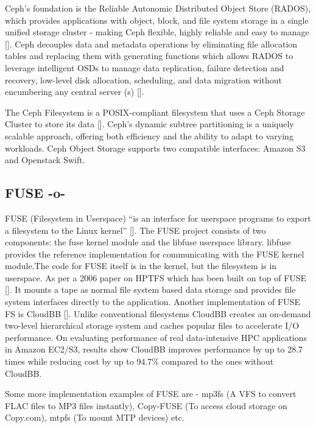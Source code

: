 Ceph's foundation is the Reliable Autonomic Distributed Object Store
(RADOS), which provides applications with object, block, and file
system storage in a single unified storage cluster - making Ceph
flexible, highly reliable and easy to manage [\cite{www-cepharch}]. Ceph
decouples data and metadata operations by eliminating file allocation
tables and replacing them with generating functions which allows RADOS
to leverage intelligent OSDs to manage data replication, failure
detection and recovery, low-level disk allocation, scheduling, and
data migration without encumbering any central server
(s) [\cite{paper-Ceph}].
 
The Ceph Filesystem is a POSIX-compliant filesystem that uses a Ceph
Storage Cluster to store its data [\cite{www-cephfs}]. Ceph's dynamic
subtree partitioning is a uniquely scalable approach, offering both
efficiency and the ability to adapt to varying workloads. Ceph Object
Storage supports two compatible interfaces: Amazon S3 and Openstack
Swift.



\subsection{FUSE -o-}

FUSE (Filesystem in Userspace) ``is an interface for userspace
programs to export a filesystem to the Linux
kernel'' [\cite{www-fuse}]. The FUSE project consists of two components:
the fuse kernel module and the libfuse userspace library. libfuse
provides the reference implementation for communicating with the FUSE
kernel module.The code for FUSE itself is in the kernel, but the
filesystem is in userspace.  As per a 2006 paper on HPTFS which has
been built on top of FUSE [\cite{fuse-paper-hptfs}]. It mounts a tape as
normal file system based data storage and provides file system
interfaces directly to the application.  Another implementation of
FUSE FS is CloudBB [\cite{fuse-paper-CloudBB}]. Unlike conventional
filesystems CloudBB creates an on-demand two-level hierarchical
storage system and caches popular files to accelerate I/O
performance. On evaluating performance of real data-intensive HPC
applications in Amazon EC2/S3, results show CloudBB improves
performance by up to 28.7 times while reducing cost by up to 94.7\%
compared to the ones without CloudBB.

Some more implementation examples of FUSE are - mp3fs (A VFS to
convert FLAC files to MP3 files instantly), Copy-FUSE (To access cloud
storage on Copy.com), mtpfs (To mount MTP devices) etc.



